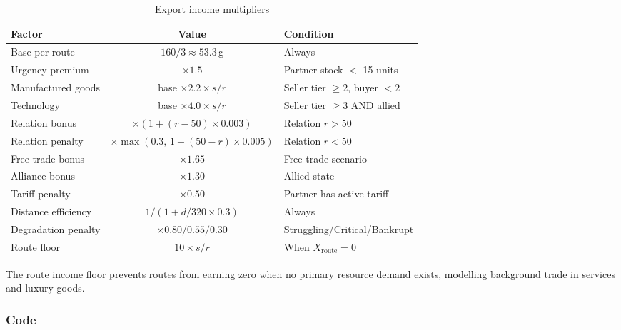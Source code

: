 \documentclass[12pt,a4paper]{article}
\begin{document}
\begin{table}[h]
\centering
\caption{Export income multipliers}
\begin{tabular}{|l|c|l|}
\hline
\textbf{Factor} & \textbf{Value} & \textbf{Condition} \\
\hline
Base per route      & $160 / 3 \approx 53.3$\,g      & Always \\
Urgency premium     & $\times 1.5$                    & Partner stock $<$ 15 units \\
Manufactured goods  & base $\times 2.2 \times s/r$   & Seller tier $\geq 2$, buyer $< 2$ \\
Technology          & base $\times 4.0 \times s/r$   & Seller tier $\geq 3$ AND allied \\
Relation bonus      & $\times(1 + (r-50)\times0.003)$& Relation $r > 50$ \\
Relation penalty    & $\times\max(0.3,\,1-(50-r)\times0.005)$ & Relation $r < 50$ \\
Free trade bonus    & $\times 1.65$                  & Free trade scenario \\
Alliance bonus      & $\times 1.30$                  & Allied state \\
Tariff penalty      & $\times 0.50$                  & Partner has active tariff \\
Distance efficiency & $1/(1 + d/320 \times 0.3)$     & Always \\
Degradation penalty & $\times 0.80 / 0.55 / 0.30$   & Struggling/Critical/Bankrupt \\
Route floor         & $10 \times s/r$                & When $X_{\text{route}} = 0$ \\
\hline
\end{tabular}
\end{table}

The route income floor prevents routes from earning zero when no primary resource demand exists, modelling background trade in services and luxury goods.

\subsubsection{Code}
\end{document}
